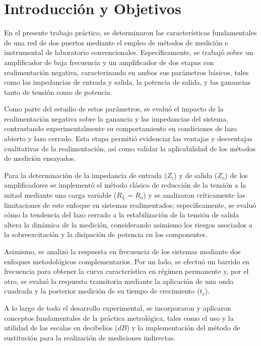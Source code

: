 \chapter{Introducción y Objetivos}
\label{chap:introduccion}

En el presente trabajo práctico, se determinaron las características
fundamentales de una red de dos puertos mediante el empleo de métodos de
medición e instrumental de laboratorio convencionales. Específicamente, se
trabajó sobre un amplificador de baja frecuencia y un amplificador de dos etapas
con realimentación negativa, caracterizando en ambos sus parámetros básicos,
tales como las impedancias de entrada y salida, la potencia de salida, y las
ganancias tanto de tensión como de potencia.

Como parte del estudio de estos parámetros, se evaluó el impacto de la
realimentación negativa sobre la ganancia y las impedancias del sistema,
contrastando experimentalmente su comportamiento en condiciones de lazo abierto
y lazo cerrado. Esta etapa permitió evidenciar las ventajas y desventajas
cualitativas de la realimentación, así como validar la aplicabilidad de los
métodos de medición ensayados.

Para la determinación de la impedancia de entrada ($Z_i$) y de salida ($Z_o$) de
los amplificadores se implementó el método clásico de reducción de la tensión a
la mitad mediante una carga variable ($R_L = R_o$) y se analizaron críticamente
las limitaciones de este enfoque en sistemas realimentados; específicamente, se
evaluó cómo la tendencia del lazo cerrado a la estabilización de la tensión de
salida altera la dinámica de la medición, considerando asimismo los riesgos
asociados a la sobreexcitación y la disipación de potencia en los componentes.

Asimismo, se analizó la respuesta en frecuencia de los sistemas mediante dos
enfoques metodológicos complementarios. Por un lado, se efectuó un barrido en
frecuencia para obtener la curva característica en régimen permanente y, por el
otro, se evaluó la respuesta transitoria mediante la aplicación de una onda
cuadrada y la posterior medición de su tiempo de crecimiento ($t_r$).

A lo largo de todo el desarrollo experimental, se incorporaron y aplicaron
conceptos fundamentales de la práctica metrológica, tales como el uso y la
utilidad de las escalas en decibelios ($dB$) y la implementación del método de
sustitución para la realización de mediciones indirectas.

